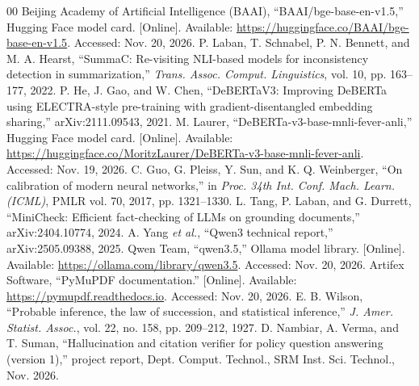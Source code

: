 \documentclass[conference]{IEEEtran}
\begin{document}
\begin{thebibliography}{00}
 Beijing Academy of Artificial Intelligence (BAAI), ``BAAI/bge-base-en-v1.5,'' Hugging Face model card. [Online]. Available: \url{https://huggingface.co/BAAI/bge-base-en-v1.5}. Accessed: Nov. 20, 2026.
 P. Laban, T. Schnabel, P. N. Bennett, and M. A. Hearst, ``SummaC: Re-visiting NLI-based models for inconsistency detection in summarization,'' \emph{Trans. Assoc. Comput. Linguistics}, vol. 10, pp. 163--177, 2022.
 P. He, J. Gao, and W. Chen, ``DeBERTaV3: Improving DeBERTa using ELECTRA-style pre-training with gradient-disentangled embedding sharing,'' arXiv:2111.09543, 2021.
 M. Laurer, ``DeBERTa-v3-base-mnli-fever-anli,'' Hugging Face model card. [Online]. Available: \url{https://huggingface.co/MoritzLaurer/DeBERTa-v3-base-mnli-fever-anli}. Accessed: Nov. 19, 2026.
 C. Guo, G. Pleiss, Y. Sun, and K. Q. Weinberger, ``On calibration of modern neural networks,'' in \emph{Proc. 34th Int. Conf. Mach. Learn. (ICML)}, PMLR vol. 70, 2017, pp. 1321--1330.
 L. Tang, P. Laban, and G. Durrett, ``MiniCheck: Efficient fact-checking of LLMs on grounding documents,'' arXiv:2404.10774, 2024.
 A. Yang \emph{et al.}, ``Qwen3 technical report,'' arXiv:2505.09388, 2025.
 Qwen Team, ``qwen3.5,'' Ollama model library. [Online]. Available: \url{https://ollama.com/library/qwen3.5}. Accessed: Nov. 20, 2026.
 Artifex Software, ``PyMuPDF documentation.'' [Online]. Available: \url{https://pymupdf.readthedocs.io}. Accessed: Nov. 20, 2026.
 E. B. Wilson, ``Probable inference, the law of succession, and statistical inference,'' \emph{J. Amer. Statist. Assoc.}, vol. 22, no. 158, pp. 209--212, 1927.
 D. Nambiar, A. Verma, and T. Suman, ``Hallucination and citation verifier for policy question answering (version 1),'' project report, Dept. Comput. Technol., SRM Inst. Sci. Technol., Nov. 2026.
\end{thebibliography}
\end{document}
